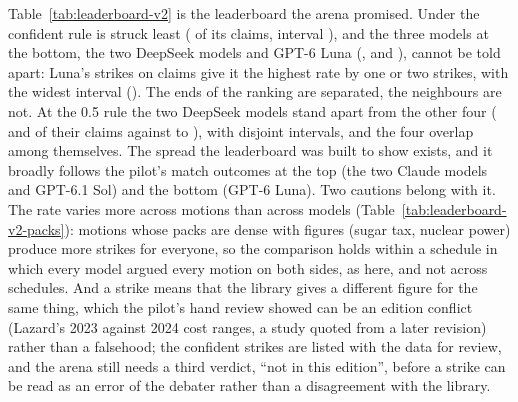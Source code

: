 \begin{table}[htbp]
\centering\small
{}
\caption{Leaderboard v2: the pilot's \studyLbClaims{} claims judged again by \jev{} under the framed criterion over every passage the arena read. ``Struck (pilot)'' is what the arena's original question caught. Models are ordered by the confident rate; Wilson 95\% intervals. The win rate is the pilot's match outcome, unchanged.}
\label{tab:leaderboard-v2}
\end{table}

\begin{table}[htbp]
\centering\small
{}
\caption{Leaderboard v2 by motion: contradiction rates vary more across motions than across models.}
\label{tab:leaderboard-v2-packs}
\end{table}

Table~\ref{tab:leaderboard-v2} is the leaderboard the arena promised. Under the confident rule \studyLbBest{} is struck least (\studyLbRateConfidentClaudeSonnetFiveFive{} of its claims, interval \studyLbCiConfidentClaudeSonnetFiveFive{}), and the three models at the bottom, the two DeepSeek models and GPT-6 Luna (\studyLbRateConfidentDeepseekVFourPro{}, \studyLbRateConfidentDeepseekVFourFlash{} and \studyLbRateConfidentGptSixLuna{}), cannot be told apart: Luna's \studyLbCountConfidentGptSixLuna{} strikes on \studyLbClaimsGptSixLuna{} claims give it the highest rate by one or two strikes, with the widest interval (\studyLbCiConfidentGptSixLuna{}). The ends of the ranking are separated, the neighbours are not. At the 0.5 rule the two DeepSeek models stand apart from the other four (\studyLbRateDeepseekVFourPro{} and \studyLbRateDeepseekVFourFlash{} of their claims against \studyLbRateGptSixOneSol{} to \studyLbRateClaudeOpusFiveFive{}), with disjoint intervals, and the four overlap among themselves. The spread the leaderboard was built to show exists, and it broadly follows the pilot's match outcomes at the top (the two Claude models and GPT-6.1 Sol) and the bottom (GPT-6 Luna). Two cautions belong with it. The rate varies more across motions than across models (Table~\ref{tab:leaderboard-v2-packs}): motions whose packs are dense with figures (sugar tax, nuclear power) produce more strikes for everyone, so the comparison holds within a schedule in which every model argued every motion on both sides, as here, and not across schedules. And a strike means that the library gives a different figure for the same thing, which the pilot's hand review showed can be an edition conflict (Lazard's 2023 against 2024 cost ranges, a study quoted from a later revision) rather than a falsehood; the \studyLbContradictedConfident{} confident strikes are listed with the data for review, and the arena still needs a third verdict, ``not in this edition'', before a strike can be read as an error of the debater rather than a disagreement with the library.

